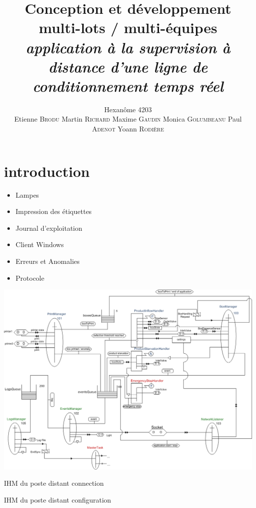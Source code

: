 \documentclass{beamer}
\title{Conception et développement multi-lots /  multi-équipes\\ \emph{application à la supervision à distance d'une ligne de conditionnement temps réel}}
\author{Hexanôme 4203\\Etienne \textsc{Brodu} Martin \textsc{Richard} Maxime \textsc{Gaudin} Monica \textsc{Golumbeanu} Paul \textsc{Adenot} Yoann \textsc{Rodière}}
\begin{document}
	\begin{frame}
		\titlepage
	\end{frame}

\section{introduction}
	\begin{frame}
		\begin{itemize}	
			\item Lampes
			\item Impression des étiquettes %
			\item Journal d'exploitation
			\item Client Windows
			\item Erreurs et Anomalies
			\item Protocole
		\end{itemize}
	\end{frame}

	\begin{frame}
		\includegraphics[width=\textwidth]{../../SchemasLCG/schemaGlobal.png}
	\end{frame}

	\begin{frame}
		IHM du poste distant
		connection
	\end{frame}

	\begin{frame}
		IHM du poste distant
		configuration
	\end{frame}
\end{document}
